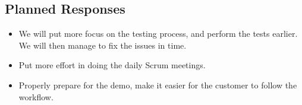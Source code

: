 \subsection{Planned Responses}
\begin{itemize}
\item We will put more focus on the testing process, and perform the tests earlier. We will then manage to fix the issues in time.
\item Put more effort in doing the daily Scrum meetings.
\item Properly prepare for the demo, make it easier for the customer to follow the workflow.
\end{itemize}
